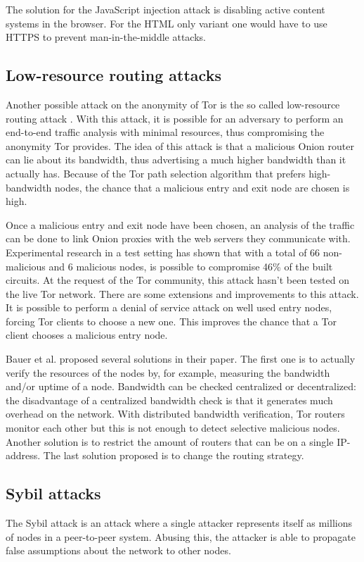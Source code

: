 \documentclass{article}
\begin{document}
		The solution for the JavaScript injection attack is disabling active content systems in the browser. For the HTML only variant one would have to use HTTPS to prevent man-in-the-middle attacks.
		
	\subsection{Low-resource routing attacks}
		Another possible attack on the anonymity of Tor is the so called low-resource routing attack \cite{bauer2007low}. With this attack, it is possible for an adversary to perform an end-to-end traffic analysis with minimal resources, thus compromising the anonymity Tor provides. The idea of this attack is that a malicious Onion router can lie about its bandwidth, thus advertising a much higher bandwidth than it actually has. Because of the Tor path selection algorithm that prefers high-bandwidth nodes, the chance that a malicious entry and exit node are chosen is high.

		Once a malicious entry and exit node have been chosen, an analysis of the traffic can be done to link Onion proxies with the web servers they communicate with. Experimental research in a test setting has shown that with a total of 66 non-malicious and 6 malicious nodes, is possible to compromise 46\% of the built circuits. At the request of the Tor community, this attack hasn't been tested on the live Tor network. There are some extensions and improvements to this attack. It is possible to perform a denial of service attack on well used entry nodes, forcing Tor clients to choose a new one. This improves the chance that a Tor client chooses a malicious entry node. 

		Bauer et al. proposed several solutions in their paper. The first one is to actually verify the resources of the nodes by, for example, measuring the bandwidth and/or uptime of a node. Bandwidth can be checked centralized or decentralized: the disadvantage of a centralized bandwidth check is that it generates much overhead on the network. With distributed bandwidth verification, Tor routers monitor each other but this is not enough to detect selective malicious nodes. Another solution is to restrict the amount of routers that can be on a single IP-address. The last solution proposed is to change the routing strategy.	
		
	\subsection{Sybil attacks}
		The Sybil attack is an attack where a single attacker represents itself as millions of nodes in a peer-to-peer system. Abusing this, the attacker is able to propagate false assumptions about the network to other nodes.
		
\end{document}

